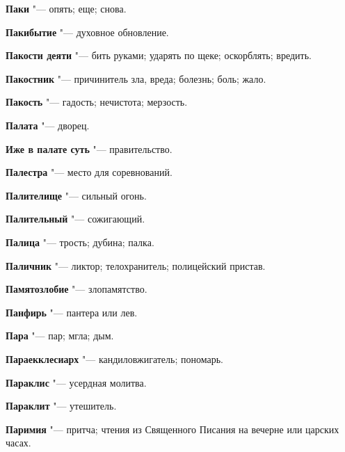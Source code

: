 \begin{mymulticols}{2}
\noindent\textbf{Паки} "--- опять; еще; снова. 




\noindent\textbf{Пакибытие} "--- духовное обновление. 




\noindent\textbf{Пакости деяти} "--- бить руками; ударять по щеке; оскорблять; вредить. 




\noindent\textbf{Пакостник} "--- причинитель зла, вреда; болезнь; боль; жало. 




\noindent\textbf{Пакость} "--- гадость; нечистота; мерзость. 




\noindent\textbf{Палата} "--- дворец. 




\noindent\textbf{Иже в палате суть} "--- правительство. 




\noindent\textbf{Палестра} "--- место для соревнований. 




\noindent\textbf{Палителище} "--- сильный огонь. 




\noindent\textbf{Палительный} "--- сожигающий. 




\noindent\textbf{Палица} "--- трость; дубина; палка. 




\noindent\textbf{Паличник} "--- ликтор; телохранитель; полицейский пристав. 




\noindent\textbf{Памятозлобие} "--- злопамятство. 




\noindent\textbf{Панфирь} "--- пантера или лев. 




\noindent\textbf{Пара} "--- пар; мгла; дым. 




\noindent\textbf{Параекклесиарх} "--- кандиловжигатель; пономарь. 




\noindent\textbf{Параклис} "--- усердная молитва. 




\noindent\textbf{Параклит} "--- утешитель. 




\noindent\textbf{Паримия} "--- притча; чтения из Священного Писания на вечерне или царских часах. 





\end{mymulticols}
